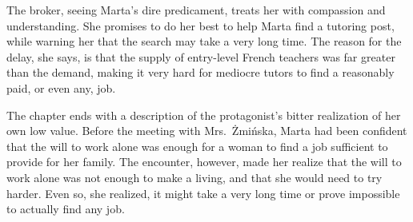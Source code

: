 The broker, seeing Marta's dire predicament, treats her with compassion and understanding.
She promises to do her best to help Marta find a tutoring post, while warning her that the search may take a very long time.
The reason for the delay, she says, is that the supply of entry-level French teachers was far greater than the demand, making it very hard for mediocre tutors to find a reasonably paid, or even any, job.

The chapter ends with a description of the protagonist's bitter realization of her own low value.
Before the meeting with Mrs.\ Żmińska, Marta had been confident that the will to work alone was enough for a woman to find a job sufficient to provide for her family.
The encounter, however, made her realize that the will to work alone was not enough to make a living, and that she would need to try harder.
Even so, she realized, it might take a very long time or prove impossible to actually find any job.
